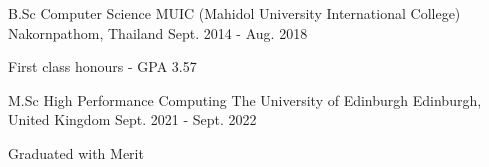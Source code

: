 

\begin{cventries}

  \cventry
    {B.Sc Computer Science} %
    {MUIC (Mahidol University International College)} %
    {Nakornpathom, Thailand} %
    {Sept. 2014 - Aug. 2018} %
    {
      \begin{cvitems} %
        \item {First class honours - GPA 3.57}
      \end{cvitems}
    }

  \cventry
    {M.Sc High Performance Computing} %
    {The University of Edinburgh} %
    {Edinburgh, United Kingdom} %
    {Sept. 2021 - Sept. 2022} %
    {
      \begin{cvitems} %
        \item {Graduated with Merit}
      \end{cvitems}
    }
    

\end{cventries}
